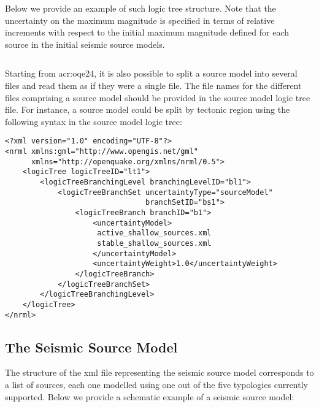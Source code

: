 Below we provide an example of such logic tree structure. Note that the
uncertainty on the maximum magnitude is specified in terms of relative
increments with respect to the initial maximum magnitude defined for each
source in the initial seismic source models.

\inputminted[firstline=1,firstnumber=1,fontsize=\footnotesize,frame=single,linenos,bgcolor=lightgray]{xml}{oqum/hazard/verbatim/input_sslt_simple_lt.xml}

Starting from \glsdesc{acr:oqe24}, it is also possible to split a source model
into several files and read them as if they were a single file. The file names
for the different files comprising a source model should be provided in the
source model logic tree file. For instance, a source model could be split by
tectonic region using the following syntax in the source model logic tree:

\begin{verbatim}
<?xml version="1.0" encoding="UTF-8"?>
<nrml xmlns:gml="http://www.opengis.net/gml"
      xmlns="http://openquake.org/xmlns/nrml/0.5">
    <logicTree logicTreeID="lt1">
        <logicTreeBranchingLevel branchingLevelID="bl1">
            <logicTreeBranchSet uncertaintyType="sourceModel"
                                branchSetID="bs1">
                <logicTreeBranch branchID="b1">
                    <uncertaintyModel>
				     active_shallow_sources.xml
				     stable_shallow_sources.xml
				    </uncertaintyModel>
                    <uncertaintyWeight>1.0</uncertaintyWeight>
                </logicTreeBranch>
            </logicTreeBranchSet>
        </logicTreeBranchingLevel>
    </logicTree>
</nrml>
\end{verbatim}


\subsection{The Seismic Source Model}

The structure of the xml file representing the seismic source model
corresponds to a list of sources, each one modelled using one out of the five
typologies currently supported. Below we provide a schematic example of a
seismic source model:

